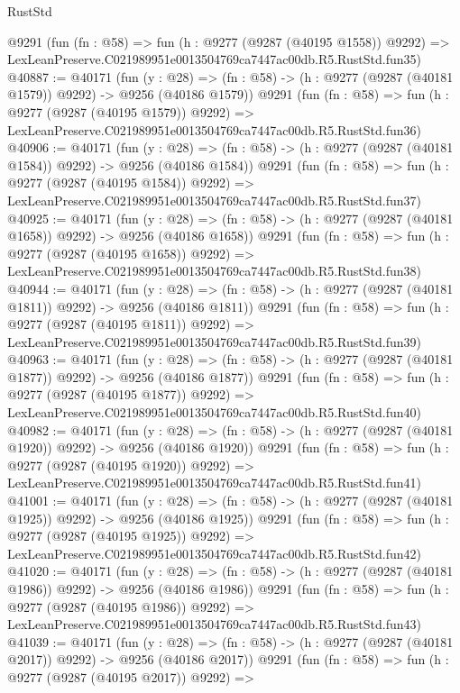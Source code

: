 \begin{lexlean}{RustStd}
\begin{coremodule}
    @9291
    (fun (fn : @58) =>
    fun (h : @9277 (@9287 (@40195 @1558)) @9292) =>
    LexLeanPreserve.C021989951e0013504769ca7447ac00db.R5.RustStd.fun35)
@40887 := @40171
    (fun (y : @28) =>
    (fn : @58) -> (h : @9277 (@9287 (@40181 @1579)) @9292) -> @9256 (@40186 @1579))
    @9291
    (fun (fn : @58) =>
    fun (h : @9277 (@9287 (@40195 @1579)) @9292) =>
    LexLeanPreserve.C021989951e0013504769ca7447ac00db.R5.RustStd.fun36)
@40906 := @40171
    (fun (y : @28) =>
    (fn : @58) -> (h : @9277 (@9287 (@40181 @1584)) @9292) -> @9256 (@40186 @1584))
    @9291
    (fun (fn : @58) =>
    fun (h : @9277 (@9287 (@40195 @1584)) @9292) =>
    LexLeanPreserve.C021989951e0013504769ca7447ac00db.R5.RustStd.fun37)
@40925 := @40171
    (fun (y : @28) =>
    (fn : @58) -> (h : @9277 (@9287 (@40181 @1658)) @9292) -> @9256 (@40186 @1658))
    @9291
    (fun (fn : @58) =>
    fun (h : @9277 (@9287 (@40195 @1658)) @9292) =>
    LexLeanPreserve.C021989951e0013504769ca7447ac00db.R5.RustStd.fun38)
@40944 := @40171
    (fun (y : @28) =>
    (fn : @58) -> (h : @9277 (@9287 (@40181 @1811)) @9292) -> @9256 (@40186 @1811))
    @9291
    (fun (fn : @58) =>
    fun (h : @9277 (@9287 (@40195 @1811)) @9292) =>
    LexLeanPreserve.C021989951e0013504769ca7447ac00db.R5.RustStd.fun39)
@40963 := @40171
    (fun (y : @28) =>
    (fn : @58) -> (h : @9277 (@9287 (@40181 @1877)) @9292) -> @9256 (@40186 @1877))
    @9291
    (fun (fn : @58) =>
    fun (h : @9277 (@9287 (@40195 @1877)) @9292) =>
    LexLeanPreserve.C021989951e0013504769ca7447ac00db.R5.RustStd.fun40)
@40982 := @40171
    (fun (y : @28) =>
    (fn : @58) -> (h : @9277 (@9287 (@40181 @1920)) @9292) -> @9256 (@40186 @1920))
    @9291
    (fun (fn : @58) =>
    fun (h : @9277 (@9287 (@40195 @1920)) @9292) =>
    LexLeanPreserve.C021989951e0013504769ca7447ac00db.R5.RustStd.fun41)
@41001 := @40171
    (fun (y : @28) =>
    (fn : @58) -> (h : @9277 (@9287 (@40181 @1925)) @9292) -> @9256 (@40186 @1925))
    @9291
    (fun (fn : @58) =>
    fun (h : @9277 (@9287 (@40195 @1925)) @9292) =>
    LexLeanPreserve.C021989951e0013504769ca7447ac00db.R5.RustStd.fun42)
@41020 := @40171
    (fun (y : @28) =>
    (fn : @58) -> (h : @9277 (@9287 (@40181 @1986)) @9292) -> @9256 (@40186 @1986))
    @9291
    (fun (fn : @58) =>
    fun (h : @9277 (@9287 (@40195 @1986)) @9292) =>
    LexLeanPreserve.C021989951e0013504769ca7447ac00db.R5.RustStd.fun43)
@41039 := @40171
    (fun (y : @28) =>
    (fn : @58) -> (h : @9277 (@9287 (@40181 @2017)) @9292) -> @9256 (@40186 @2017))
    @9291
    (fun (fn : @58) =>
    fun (h : @9277 (@9287 (@40195 @2017)) @9292) =>

\end{coremodule}
\end{lexlean}
